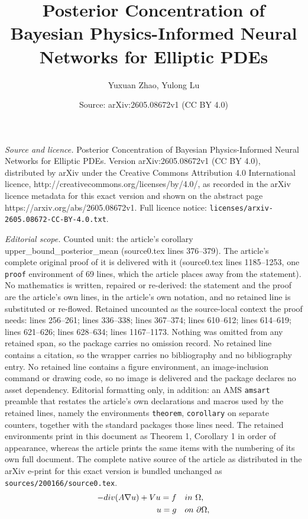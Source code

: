 \documentclass[10pt,a4paper]{amsart}
\title{Posterior Concentration of Bayesian Physics-Informed Neural Networks for Elliptic PDEs}
\author{Yuxuan Zhao, Yulong Lu}
\date{Source: arXiv:2605.08672v1 (CC BY 4.0)}
\renewcommand{\div}{\textnormal{div}}
\begin{document}
\maketitle

\noindent\emph{Source and licence.} Posterior Concentration of Bayesian Physics-Informed Neural Networks for Elliptic PDEs. Version arXiv:2605.08672v1 (CC BY 4.0), distributed by arXiv under the Creative Commons Attribution 4.0 International licence, http://creativecommons.org/licenses/by/4.0/, as recorded in the arXiv licence metadata for this exact version and shown on the abstract page https://arxiv.org/abs/2605.08672v1. Full licence notice: \texttt{licenses/arxiv-2605.08672-CC-BY-4.0.txt}.\par\smallskip

\noindent\textit{Editorial scope.} Counted unit: the article's corollary upper\_bound\_posterior\_mean (source0.tex lines 376--379). The article's complete original proof of it is delivered with it (source0.tex lines 1185--1253, one \texttt{proof} environment of 69 lines, which the article places away from the statement). No mathematics is written, repaired or re-derived: the statement and the proof are the article's own lines, in the article's own notation, and no retained line is substituted or re-flowed.  Retained uncounted as the source-local context the proof needs: lines 256--261; lines 336--338; lines 367--374; lines 610--612; lines 614--619; lines 621--626; lines 628--634; lines 1167--1173.  Nothing was omitted from any retained span, so the package carries no omission record.  No retained line contains a citation, so the wrapper carries no bibliography and no bibliography entry.  No retained line contains a figure environment, an image-inclusion command or drawing code, so no image is delivered and the package declares no asset dependency.  Editorial formatting only, in addition: an AMS \texttt{amsart} preamble that restates the article's own declarations and macros used by the retained lines, namely the environments \texttt{theorem}, \texttt{corollary} on separate counters, together with the standard packages those lines need.  The retained environments print in this document as Theorem 1, Corollary 1 in order of appearance, whereas the article prints the same items with the numbering of its own full document.  The complete native source of the article as distributed in the arXiv e-print for this exact version is bundled unchanged as \texttt{sources/200166/source0.tex}.
\begin{equation}\label{elliptic_pde}
\begin{aligned}
    - \div (A \nabla u) + V u = f  \quad & \textnormal{in} \ \Omega, \\
    u = g \quad & \textnormal{on} \ \partial \Omega, 
\end{aligned}
\end{equation}
\end{document}
